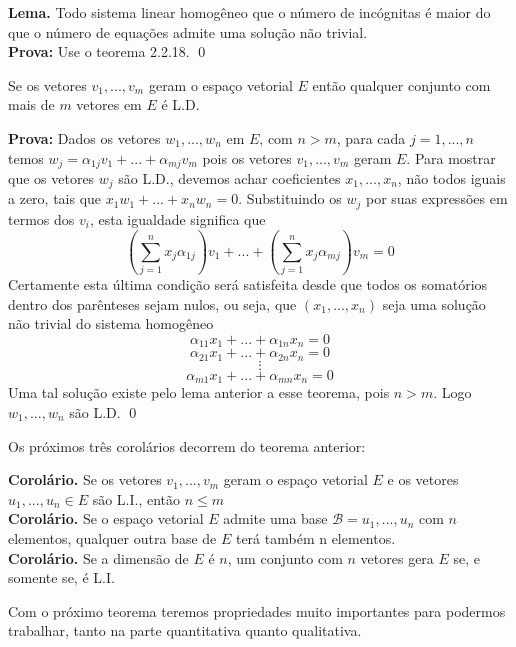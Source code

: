 \documentclass[../main.tex]{subfiles}
\begin{document}
	\smallskip
	
	\textbf{Lema.} Todo sistema linear homogêneo que o número de incógnitas é maior do que o número de equações admite uma solução não trivial.
	\\ \smallskip
	\textbf{Prova:} Use o teorema 2.2.18. \qed
	\smallskip
	
	\begin{teorema}
		Se os vetores $v_1, ..., v_m$ geram o espaço vetorial $E$ então qualquer conjunto com mais de $m$ vetores em $E$ é L.D.
	\end{teorema}
	\textbf{Prova:} Dados os vetores $w_1, ..., w_n$ em $E$, com $n > m$, para cada $j = 1, ..., n$ temos $w_j = \alpha_{1j}v_1 + ... + \alpha_{mj}v_m$ pois os vetores $v_1,...,v_m$ geram $E$. Para mostrar que os vetores $w_j$ são L.D., devemos achar coeficientes $x_1, ..., x_n$, não todos iguais a zero, tais que $x_1w_1+...+x_nw_n=0$. Substituindo os $w_j$ por suas expressões em termos dos $v_i$, esta igualdade significa que
	$$\left(\sum_{j=1}^{n}x_j\alpha_{1j}\right)v_1+...+\left(\sum_{j=1}^{n}x_j\alpha_{mj}\right)v_m = 0$$
	Certamente esta última condição será satisfeita desde que todos os somatórios dentro dos parênteses sejam nulos, ou seja, que $(x_1, ..., x_n)$ seja uma solução não trivial do sistema homogêneo 
	$$\alpha_{11}x_1+...+\alpha_{1n}x_n = 0$$
	$$\alpha_{21}x_1+...+\alpha_{2n}x_n = 0$$
	$$\vdots$$
	$$\alpha_{m1}x_1+...+\alpha_{mn}x_n = 0$$
	Uma tal solução existe pelo lema anterior a esse teorema, pois $n>m$. Logo $w_1, ..., w_n$ são L.D. \qed
	
	Os próximos três corolários decorrem do teorema anterior:
	
	\textbf{Corolário.} Se os vetores $v_1, ..., v_m$ geram o espaço vetorial $E$ e os vetores $u_1,...,u_n \in E$ são L.I., então $n\leqslant m$
	\\
	\textbf{Corolário.} Se o espaço vetorial $E$ admite uma base $\mathcal{B}={u_1,...,u_n}$ com $n$ elementos, qualquer outra base de $E$ terá também n elementos.
	\\
	\textbf{Corolário.} Se a dimensão de $E$ é $n$, um conjunto com $n$ vetores gera $E$ se, e somente se, é L.I. 
	
	Com o próximo teorema teremos propriedades muito importantes para podermos trabalhar, tanto na parte quantitativa quanto qualitativa.
	
\end{document}
